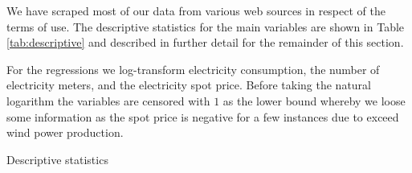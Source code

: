 \label{sec:data}
We have scraped most of our data from various web sources in respect of the terms of use. The descriptive statistics for the main variables are shown in Table \ref{tab:descriptive} and described in further detail for the remainder of this section.
\par
For the regressions we log-transform electricity consumption, the number of electricity meters, and the electricity spot price. Before taking the natural logarithm the variables are censored with $1$ as the lower bound whereby we loose some information as the spot price is negative for a few instances due to exceed wind power production.
\begin{table}[H]
  \centering
  \caption{Descriptive statistics}
  \label{tab:descriptive}
  \footnotesize
    
\end{table}

